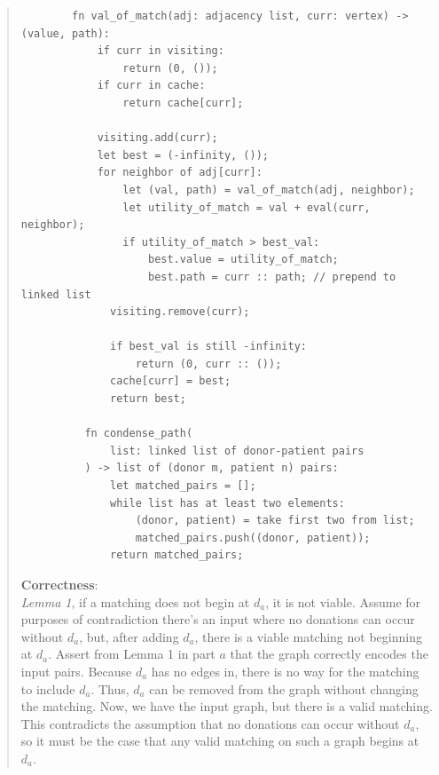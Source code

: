 \documentclass[11pt]{article}
\begin{document}
\begin{enumerate}
\begin{enumerate}
\begin{quote}
\begin{verbatim}
        fn val_of_match(adj: adjacency list, curr: vertex) -> (value, path):
            if curr in visiting:
                return (0, ());
            if curr in cache:
                return cache[curr];

            visiting.add(curr);
            let best = (-infinity, ());
            for neighbor of adj[curr]:
                let (val, path) = val_of_match(adj, neighbor);
                let utility_of_match = val + eval(curr, neighbor);
                if utility_of_match > best_val:
                    best.value = utility_of_match;
                    best.path = curr :: path; // prepend to linked list
              visiting.remove(curr);

              if best_val is still -infinity:
                  return (0, curr :: ());
              cache[curr] = best;
              return best;

          fn condense_path(
              list: linked list of donor-patient pairs
          ) -> list of (donor m, patient n) pairs:
              let matched_pairs = [];
              while list has at least two elements: 
                  (donor, patient) = take first two from list;
                  matched_pairs.push((donor, patient));
              return matched_pairs;
        \end{verbatim}


      \medskip
        \textbf{Correctness}: \\ 
      \textit{Lemma 1}, if a matching does not begin at $d_a$, it is not viable. Assume for purposes of contradiction there's an input where no donations can occur without $d_a$, but, after adding $d_a$, there is a viable matching not beginning at $d_a$. Assert from Lemma 1 in part $a$ that the graph correctly encodes the input pairs. Because $d_a$ has no edges in, there is no way for the matching to include $d_a$. Thus, $d_a$ can be removed from the graph without changing the matching. Now, we have the input graph, but there is a valid matching. This contradicts the assumption that no donations can occur without $d_a$, so it must be the case that any valid matching on such a graph begins at $d_a$.


\end{quote}
\end{enumerate}
\end{enumerate}
\end{document}
